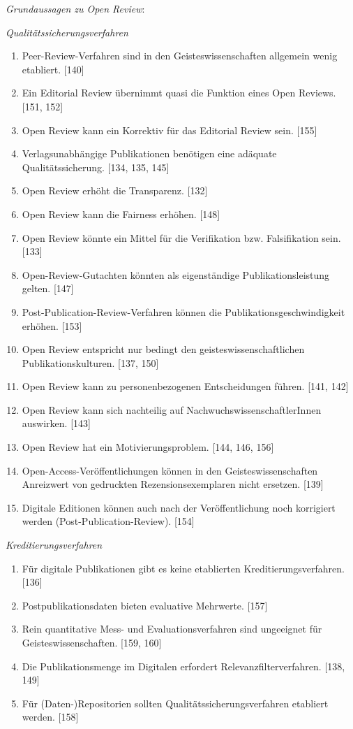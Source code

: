 \documentclass[a4paper,
fontsize=11pt,
oneside,
numbers=noperiodatend,
parskip=half-,
bibliography=totoc,
final
]{scrartcl}
\begin{document}
\pagebreak
\emph{Grundaussagen zu Open Review}:

\emph{Qualitätssicherungsverfahren}

\begin{enumerate}
\def\labelenumi{(\arabic{enumi})}
\item
  Peer-Review-Verfahren sind in den Geisteswissenschaften allgemein wenig etabliert. {[}140{]}
\item
  Ein Editorial Review übernimmt quasi die Funktion eines Open Reviews. {[}151, 152{]}
\item
  Open Review kann ein Korrektiv für das Editorial Review sein. {[}155{]}
\item
  Verlagsunabhängige Publikationen benötigen eine adäquate Qualitätssicherung. {[}134, 135, 145{]}
\item
  Open Review erhöht die Transparenz. {[}132{]}
\item
  Open Review kann die Fairness erhöhen. {[}148{]}
\item
  Open Review könnte ein Mittel für die Verifikation bzw. Falsifikation sein. {[}133{]}
\item
  Open-Review-Gutachten könnten als eigenständige Publikationsleistung gelten. {[}147{]}
\item
  Post-Publication-Review-Verfahren können die Publikationsgeschwindigkeit erhöhen. {[}153{]}
\item
  Open Review entspricht nur bedingt den geisteswissenschaftlichen Publikationskulturen. {[}137, 150{]}
\item
  Open Review kann zu personenbezogenen Entscheidungen führen. {[}141, 142{]}
\item
  Open Review kann sich nachteilig auf NachwuchswissenschaftlerInnen auswirken. {[}143{]}
\item
  Open Review hat ein Motivierungsproblem. {[}144, 146, 156{]}
\item
  Open-Access-Veröffentlichungen können in den Geisteswissenschaften Anreizwert von gedruckten Rezensionsexemplaren nicht
  ersetzen. {[}139{]}
\item
  Digitale Editionen können auch nach der Veröffentlichung noch korrigiert werden (Post-Publication-Review). {[}154{]}
\end{enumerate}

\emph{Kreditierungsverfahren}

\begin{enumerate}
\def\labelenumi{(\arabic{enumi})}
\item
  Für digitale Publikationen gibt es keine etablierten Kreditierungsverfahren. {[}136{]}
\item
  Postpublikationsdaten bieten evaluative Mehrwerte. {[}157{]}
\item
  Rein quantitative Mess- und Evaluationsverfahren sind ungeeignet für Geisteswissenschaften. {[}159, 160{]}
\item
  Die Publikationsmenge im Digitalen erfordert Relevanzfilterverfahren. {[}138, 149{]}
\item
  Für (Daten-)Repositorien sollten Qualitätssicherungsverfahren etabliert werden. {[}158{]}
\end{enumerate}
\end{document}
